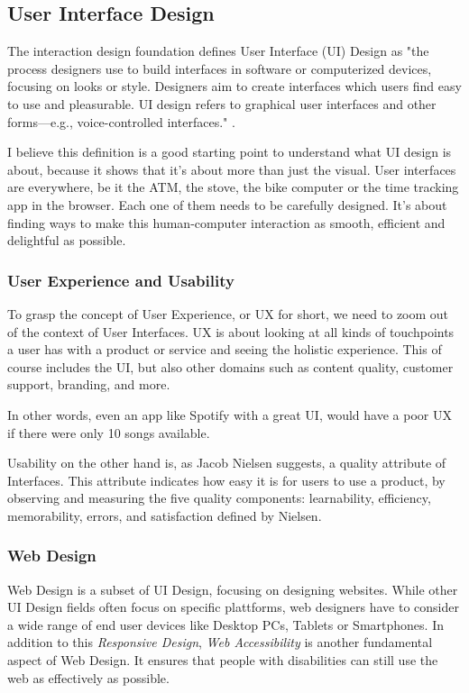 \newpage
\subsection{User Interface Design}
The interaction design foundation defines User Interface (UI) Design as "the process designers use
to build interfaces in software or computerized devices, focusing on looks or style. Designers aim
to create interfaces which users find easy to use and pleasurable. UI design refers to graphical
user interfaces and other forms—e.g., voice-controlled interfaces."
.

I believe this definition is a good starting point to understand what UI design is about, because it
shows that it's about more than just the visual. User interfaces are everywhere, be it the ATM, the
stove, the bike computer or the time tracking app in the browser. Each one of them needs to be
carefully designed. It's about finding ways to make this human-computer interaction as smooth,
efficient and delightful as possible.


\subsubsection{User Experience and Usability}
To grasp the concept of User Experience, or UX for short, we need to zoom out of the context of User
Interfaces. UX is about looking at all kinds of touchpoints a user has with a product or service and
seeing the holistic experience. This of course includes the UI, but also other domains such as
content quality, customer support, branding, and more. 

In other words, even an app like Spotify with a great UI, would have a poor UX if there were only 10
songs available.

Usability on the other hand is, as Jacob Nielsen suggests, a quality attribute of Interfaces. This
attribute indicates how easy it is for users to use a product, by observing and measuring the five
quality components: learnability, efficiency, memorability, errors, and satisfaction
defined by Nielsen. 

\subsubsection{Web Design}
Web Design is a subset of UI Design, focusing on designing websites. While other UI Design fields
often focus on specific plattforms, web designers have to consider a wide range of end user devices
like Desktop PCs, Tablets or Smartphones. In addition to this \textit{Responsive Design},
\textit{Web Accessibility} is another fundamental aspect of Web Design. It ensures that people with
disabilities can still use the web as effectively as possible.

